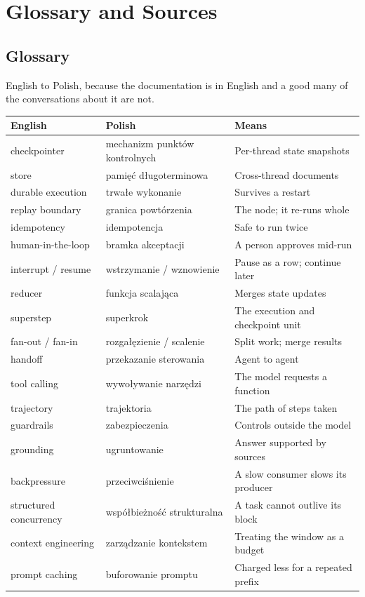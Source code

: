 \chapter{Glossary and Sources}
\label{app:glossary}

\section{Glossary}
\label{sec:appE-glossary}

English to Polish, because the documentation is in English and a good many of the
conversations about it are not.

\begin{center}
\small
\begin{tabularx}{\linewidth}{@{}lXX@{}}
\toprule
\textbf{English} & \textbf{Polish} & \textbf{Means} \\
\midrule
checkpointer & mechanizm punktów kontrolnych & Per-thread state snapshots \\
store & pamięć długoterminowa & Cross-thread documents \\
durable execution & trwałe wykonanie & Survives a restart \\
replay boundary & granica powtórzenia & The node; it re-runs whole \\
idempotency & idempotencja & Safe to run twice \\
human-in-the-loop & bramka akceptacji & A person approves mid-run \\
interrupt / resume & wstrzymanie / wznowienie & Pause as a row; continue later \\
reducer & funkcja scalająca & Merges state updates \\
superstep & superkrok & The execution and checkpoint unit \\
fan-out / fan-in & rozgałęzienie / scalenie & Split work; merge results \\
handoff & przekazanie sterowania & Agent to agent \\
tool calling & wywoływanie narzędzi & The model requests a function \\
trajectory & trajektoria & The path of steps taken \\
guardrails & zabezpieczenia & Controls outside the model \\
grounding & ugruntowanie & Answer supported by sources \\
backpressure & przeciwciśnienie & A slow consumer slows its producer \\
structured concurrency & współbieżność strukturalna & A task cannot outlive its
  block \\
context engineering & zarządzanie kontekstem & Treating the window as a budget \\
prompt caching & buforowanie promptu & Charged less for a repeated prefix \\
\bottomrule
\end{tabularx}
\end{center}

